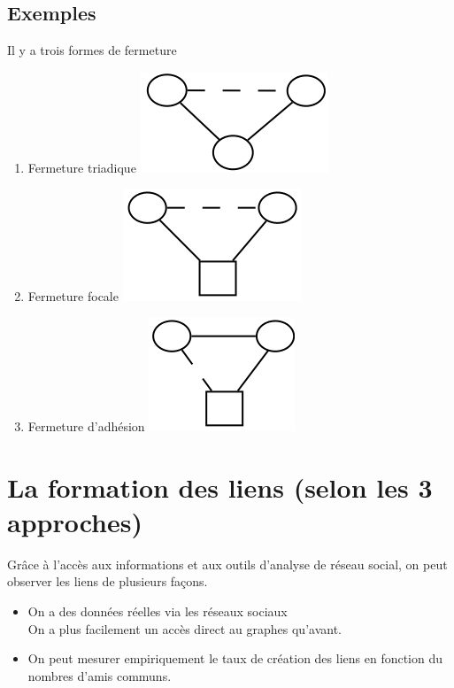 \subsection*{Exemples}
Il y a trois formes de fermeture
\begin{enumerate}
\item Fermeture triadique \includegraphics[scale=0.1]{images/21_FermetureTriadique.png}
\item Fermeture focale \includegraphics[scale=0.1]{images/21_FermetureFocale.png}
\item Fermeture d'adhésion \includegraphics[scale=0.1]{images/21_FermetureAdhesion.png}
\end{enumerate}

\section{La formation des liens (selon les 3 approches)}
Grâce à l'accès aux informations et aux outils d'analyse de réseau social, on peut observer les liens de plusieurs façons.
\begin{itemize}
\item On a des données réelles via les réseaux sociaux \\
		On a plus facilement un accès direct au graphes qu'avant.
\item On peut mesurer empiriquement le taux de création des liens en fonction du nombres d'amis communs.
\end{itemize}

